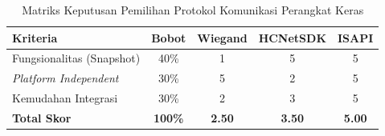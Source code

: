 \begin{table}[H]
    \centering
    \caption{Matriks Keputusan Pemilihan Protokol Komunikasi Perangkat Keras}
    \label{tab:matriks_protokol_perangkat}
    \begin{tabular}{|l|c|c|c|c|}
        \hline
        \textbf{Kriteria} & \textbf{Bobot} & \textbf{Wiegand} & \textbf{HCNetSDK} & \textbf{ISAPI} \\
        \hline
        Fungsionalitas (Snapshot) & 40\% & 1 & 5 & 5 \\
        \hline
        \textit{Platform Independent} & 30\% & 5 & 2 & 5 \\
        \hline
        Kemudahan Integrasi & 30\% & 2 & 3 & 5 \\
        \hline
        \textbf{Total Skor} & \textbf{100\%} & \textbf{2.50} & \textbf{3.50} & \textbf{5.00} \\
        \hline
    \end{tabular}
\end{table}